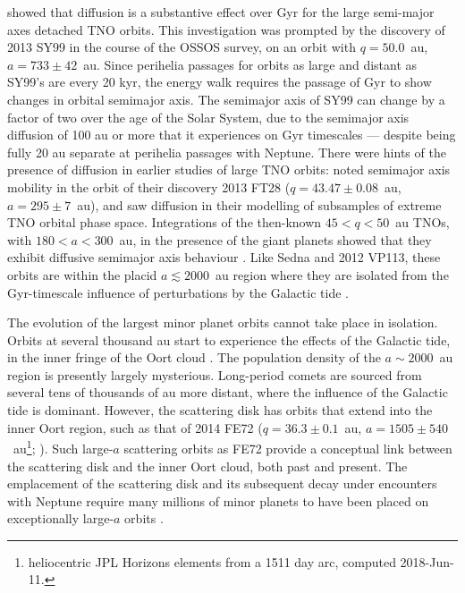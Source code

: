 \documentclass{aastex62}
\begin{document}
\citet{bannister17} showed that diffusion is a substantive effect over Gyr for the large semi-major axes detached TNO orbits.
This investigation was prompted by the discovery of 2013 SY99 in the course of the OSSOS survey, on an orbit with $q = 50.0$~au, $a = 733 \pm 42$~au.
Since perihelia passages for orbits as large and distant as SY99's are every 20 kyr, the energy walk requires the passage of Gyr to show changes in orbital semimajor axis.
The semimajor axis of SY99 can change by a factor of two over the age of the Solar System, due to the semimajor axis diffusion of 100 au or more that it experiences on Gyr timescales --- despite being fully 20 au separate at perihelia passages with Neptune.
There were hints of the presence of diffusion in earlier studies of large TNO orbits: \citet{sheppardtrujillo16} noted semimajor axis mobility in the orbit of their discovery 2013 FT28 ($q = 43.47 \pm 0.08$~au, $a = 295 \pm 7$~au), and \citet{gallardo12,brasserschwamb15} saw diffusion in their modelling of subsamples of extreme TNO orbital phase space.
Integrations of the then-known $45<q<50$~au TNOs, with $180 < a < 300$~au, in the presence of the giant planets showed that they exhibit diffusive semimajor axis behaviour \citep{bannister17}. 
Like Sedna and 2012 VP113, these orbits are within the placid $a \lesssim 2000$~au region where they are isolated from the Gyr-timescale influence of perturbations by the Galactic tide \citep{brasserschwamb15}.

The evolution of the largest minor planet orbits cannot take place in isolation. 
Orbits at several thousand au start to experience the effects of the Galactic tide, in the inner fringe of the Oort cloud \citep{dones04}.
The population density of the $a \sim 2000$~au region is presently largely mysterious. 
Long-period comets are sourced from several tens of thousands of au more distant, where the influence of the Galactic tide is dominant.
However, the scattering disk has orbits that extend into the inner Oort region, such as that of 2014 FE72 ($q = 36.3\pm 0.1$~au, $a=1505\pm 540$~au\footnote{heliocentric JPL Horizons elements from a 1511 day arc, computed 2018-Jun-11.}; \citealt{sheppardtrujillo16}).
Such large-$a$ scattering orbits as FE72 provide a conceptual link between the scattering disk and the inner Oort cloud, both past and present.
The emplacement of the scattering disk and its subsequent decay under encounters with Neptune require many millions of minor planets to have been placed on exceptionally large-$a$ orbits \citep{gladman05, levison06}.
\end{document}
